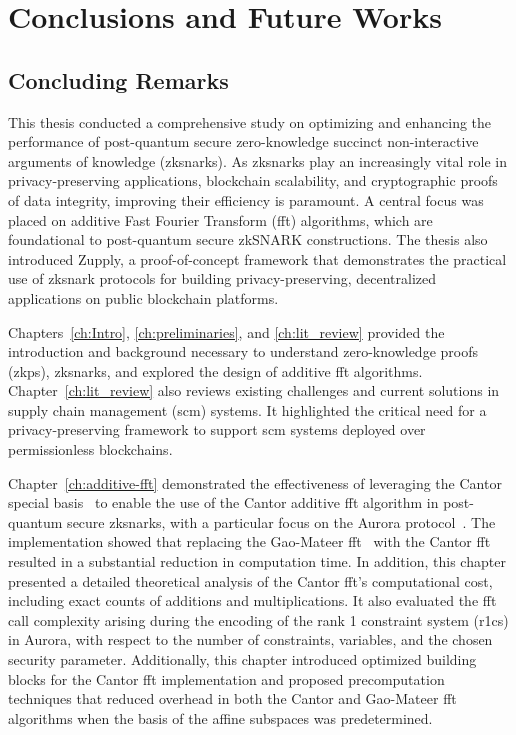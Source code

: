 \chapter{Conclusions and Future Works} \label{ch:conclusion}


\section{Concluding Remarks}
This thesis conducted a comprehensive study on optimizing and enhancing the performance of post-quantum secure zero-knowledge succinct non-interactive arguments of knowledge (\glspl{zksnark}). As \glspl{zksnark} play an increasingly vital role in privacy-preserving applications, blockchain scalability, and cryptographic proofs of data integrity, improving their efficiency is paramount. A central focus was placed on additive Fast Fourier Transform (\gls{fft}) algorithms, which are foundational to post-quantum secure zkSNARK constructions. The thesis also introduced Zupply, a proof-of-concept framework that demonstrates the practical use of \gls{zksnark} protocols for building privacy-preserving, decentralized applications on public blockchain platforms.


Chapters~\ref{ch:Intro}, \ref{ch:preliminaries}, and \ref{ch:lit_review} provided the introduction and background necessary to understand zero-knowledge proofs (\glspl{zkp}), \glspl{zksnark}, and explored the design of additive \gls{fft} algorithms. Chapter~\ref{ch:lit_review} also reviews existing challenges and current solutions in supply chain management (\gls{scm}) systems. It highlighted the critical need for a privacy-preserving framework to support \gls{scm} systems deployed over permissionless blockchains.

Chapter~\ref{ch:additive-fft} demonstrated the effectiveness of leveraging the Cantor special basis~\cite{Cantor1989FFT} to enable the use of the Cantor additive \gls{fft} algorithm in post-quantum secure \glspl{zksnark}, with a particular focus on the Aurora protocol~\cite{Aurora2019}. The implementation showed that replacing the Gao-Mateer \gls{fft}~\cite{Gao2010FFT} with the Cantor \gls{fft} resulted in a substantial reduction in computation time. In addition, this chapter presented a detailed theoretical analysis of the Cantor \gls{fft}'s computational cost, including exact counts of additions and multiplications. It also evaluated the \gls{fft} call complexity arising during the encoding of the  rank 1 constraint system (\gls{r1cs}) in Aurora, with respect to the number of constraints, variables, and the chosen security parameter. Additionally, this chapter introduced optimized building blocks for the Cantor \gls{fft} implementation and proposed precomputation techniques that reduced overhead in both the Cantor and Gao-Mateer \gls{fft} algorithms when the basis of the affine subspaces was predetermined.


